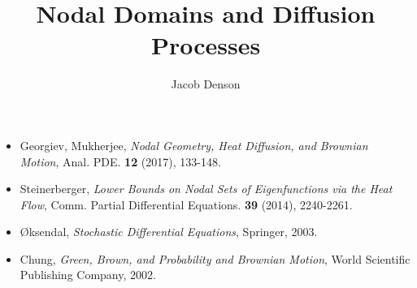 \documentclass[usenames,dvipsnames,12pt]{beamer}
\title{Nodal Domains and Diffusion Processes}
\author{Jacob Denson}
\institute{University of Wisconsin Madison}
\begin{document}
\maketitle

\begin{frame}

\begin{itemize}
    \item Georgiev, Mukherjee, \emph{Nodal Geometry, Heat Diffusion, and Brownian Motion}, Anal. PDE. {\bf 12} (2017), 133-148.
    \pause

    \item Steinerberger, \emph{Lower Bounds on Nodal Sets of Eigenfunctions via the Heat Flow}, Comm. Partial Differential Equations. {\bf 39} (2014), 2240-2261.
    \pause

    \item {\O}ksendal, \emph{Stochastic Differential Equations}, Springer, 2003.

    \item Chung, \emph{Green, Brown, and Probability and Brownian Motion}, World Scientific Publishing Company, 2002.
\end{itemize}

\end{frame}
\end{document}
